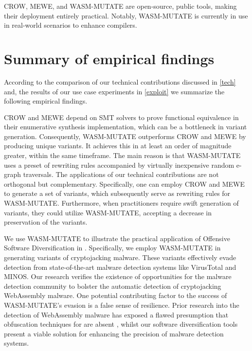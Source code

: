 CROW, MEWE, and WASM-MUTATE are open-source, public tools, making their deployment entirely practical. 
Notably, WASM-MUTATE is currently in use in real-world scenarios to enhance \Wasm compilers.

\section{Summary of empirical findings}

According to the comparison of our technical contributions discussed in \autoref{tech} and, the results of our use case experiments in \autoref{exploit} we summarize the following empirical findings.

\begin{strategy}
    CROW and MEWE depend on SMT solvers to prove functional equivalence in their enumerative synthesis implementation, which can be a bottleneck in variant generation. 
    Consequently, WASM-MUTATE outperforms CROW and MEWE by producing unique variants. 
    It achieves this in at least an order of magnitude greater, within the same timeframe.   
    The main reason is that WASM-MUTATE uses a preset of rewriting rules accompanied by virtually inexpensive random e-graph traversals.
    The applications of our technical contributions are not orthogonal but complementary. 
    Specifically, one can employ CROW and MEWE to generate a set of variants, which subsequently serve as rewriting rules for WASM-MUTATE. 
    Furthermore, when practitioners require swift generation of variants, they could utilize WASM-MUTATE, accepting a decrease in preservation of the variants.
\end{strategy}


\begin{strategy}
    We use WASM-MUTATE to illustrate the practical application of Offensive Software Diversification in \Wasm. 
    Specifically, we employ WASM-MUTATE in generating \Wasm variants of cryptojacking malware. 
    These variants effectively evade detection from state-of-the-art malware detection systems like VirusTotal and MINOS.
    Our research verifies the existence of opportunities for the malware detection community to bolster the automatic detection of cryptojacking WebAssembly malware. 
    One potential contributing factor to the success of WASM-MUTATE's evasion is a false sense of resilience. 
    Prior research into the detection of WebAssembly malware has exposed a flawed presumption that obfuscation techniques for \Wasm are absent \cite{Minesweeper, MinerRay, SEISMIC, RAPID, MINOS}, whilst our software diversification tools present a viable solution for enhancing the precision of \Wasm malware detection systems.
\end{strategy}

